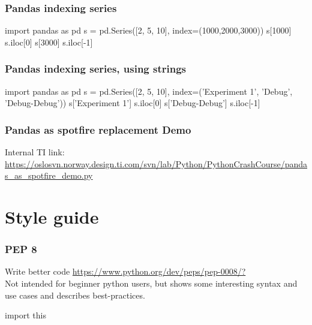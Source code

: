 \documentclass[12pt]{beamer}
\begin{document}
\begin{frame}[fragile]
\end{frame}

\begin{frame}[fragile]
\frametitle{Pandas indexing series}
\begin{pyconsole}
import pandas as pd
s = pd.Series([2, 5, 10], index=(1000,2000,3000))
s[1000]
s.iloc[0]
s[3000]
s.iloc[-1]
\end{pyconsole}
\end{frame}

\begin{frame}[fragile]
\frametitle{Pandas indexing series, using strings}
\begin{pyconsole}
import pandas as pd
s = pd.Series([2, 5, 10], index=('Experiment 1',
					'Debug',
					'Debug-Debug'))
s['Experiment 1']
s.iloc[0]
s['Debug-Debug']
s.iloc[-1]
\end{pyconsole}
\end{frame}

\begin{frame}[fragile]
\frametitle{Pandas as spotfire replacement Demo}
Internal TI link:
\url{https://oslosvn.norway.design.ti.com/svn/lab/Python/PythonCrashCourse/pandas_as_spotfire_demo.py}

\end{frame}

\section{Style guide}
\begin{frame}[fragile]
\frametitle{PEP 8}
Write better code
\url{https://www.python.org/dev/peps/pep-0008/?}\\
Not intended for beginner python users, but shows some interesting syntax and use cases and
describes best-practices.

\end{frame}

\begin{frame}[fragile]
\begin{footnotesize}
\begin{pyconsole}
import this
\end{pyconsole}
\end{footnotesize}
\end{frame}
\end{document}
